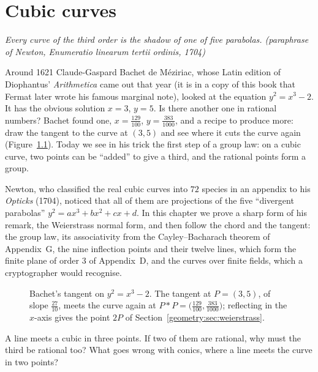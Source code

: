 \chapter{Cubic curves}\label{geometry:ch:cubics}

\begin{center}\itshape
Every curve of the third order is the shadow of one of five parabolas.
\upshape(paraphrase of Newton, \emph{Enumeratio linearum tertii ordinis}, 1704)
\end{center}

Around 1621 Claude-Gaspard Bachet de M\'eziriac, whose Latin edition of Diophantus' \emph{Arithmetica} came out that year (it is in a copy of this
book that Fermat later wrote his famous marginal note), looked at the equation $y^2=x^3-2$. It has the obvious solution $x=3$, $y=5$. Is there another
one in rational numbers? Bachet found one, $x=\frac{129}{100}$, $y=\frac{383}{1000}$, and a recipe to produce more: draw the tangent to the curve at
$(3,5)$ and see where it cuts the curve again (Figure~\ref{geometry:fig:bachet}). Today we see in his trick the first step of a group law: on a cubic curve, two
points can be ``added'' to give a third, and the rational points form a group.

Newton, who classified the real cubic curves into $72$ species in an appendix to his \emph{Opticks} (1704), noticed that all of them are projections of
the five ``divergent parabolas'' $y^2=ax^3+bx^2+cx+d$. In this chapter we prove a sharp form of his remark, the Weierstrass normal form, and then follow
the chord and the tangent: the group law, its associativity from the Cayley--Bacharach theorem of Appendix~G, the nine inflection points and their twelve
lines, which form the finite plane of order $3$ of Appendix~D, and the curves over finite fields, which a cryptographer would recognise.

\begin{figure}[ht]
\centering
{}
\caption{Bachet's tangent on $y^2=x^3-2$. The tangent at $P=(3,5)$, of slope $\frac{27}{10}$, meets the curve again at
$P*P=\bigl(\frac{129}{100},\frac{383}{1000}\bigr)$; reflecting in the $x$-axis gives the point $2P$ of Section~\ref{geometry:sec:weierstrass}.}
\label{geometry:fig:bachet}
\end{figure}

\begin{think}
A line meets a cubic in three points. If two of them are rational, why must the third be rational too? What goes wrong with conics, where a line meets
the curve in two points?
\end{think}

